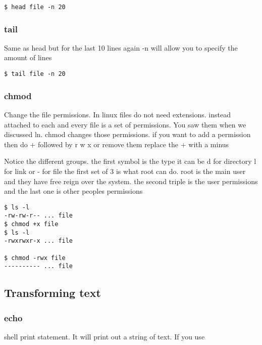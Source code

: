 \documentclass[a4paper]{article}
\begin{document}
\begin{verbatim}
$ head file -n 20
\end{verbatim}
\subsubsection*{tail}
\label{sec:org7e4d07c}
\begin{notes}
	Same as head but for the last 10 lines
	again -n will allow you to specify the amount of lines
\end{notes}

\begin{verbatim}
$ tail file -n 20
\end{verbatim}
\subsubsection*{chmod}
\label{sec:org269a6da}
\begin{notes}
	Change the file permissions. In linux files do not need extensions. instead
	attached to each and every file is a set of permissions. You saw them when we
	discussed ln. chmod changes those permissions. if you want to add a permission
	then do + followed by r w x or remove them replace the + with a minus

	Notice the different groups. the first symbol is the type it can be d for
	directory l for link or - for file
	the first set of 3 is what root can do. root is the main user and they have free
	reign over the system. the second triple is the user permissions and the last one
	is other peoples permissions
\end{notes}

\begin{verbatim}
$ ls -l
-rw-rw-r-- ... file
$ chmod +x file
$ ls -l
-rwxrwxr-x ... file

$ chmod -rwx file
---------- ... file
\end{verbatim}
\subsection*{Transforming text}
\label{sec:org9446d6e}
\subsubsection*{echo}
\label{sec:orgff253cb}
\begin{notes}
	shell print statement. It will print out a string of text. If you use
\end{notes}
\end{document}
